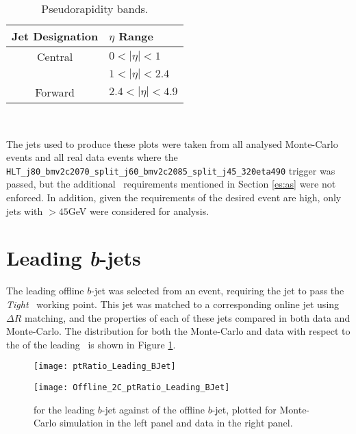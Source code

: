 	\begin{table}[h]
		\caption{Pseudorapidity bands.}
		\label{tab:etabands}
		\medskip
		\centering
		\begin{tabular}{cl}\toprule
			Jet Designation & $\eta$ Range \\\midrule
			Central & $0<|\eta|<1$ \\
			 & $1<|\eta|<2.4$  \\
			Forward & $2.4<|\eta|<4.9$ \\\bottomrule
		\end{tabular}\\[5pt]
	\end{table}

	The jets used to produce these plots were taken from all analysed Monte-Carlo events and all real data events where the \texttt{HLT\_j80\_bmv2c2070\_split\_\-j60\_bmv2c2085\_split\_j45\_320eta490} trigger was passed, but the additional \VBFHBB\, requirements mentioned in Section \ref{es:as} were not enforced. In addition, given the \pt requirements of the desired event are high, only jets with \pt$>45$GeV were considered for analysis.

\section{Leading \textit{b}-jets}
\label{OP:leadingb}

	The leading \pt offline $b$-jet was selected from an event, requiring the jet to pass the \textit{Tight} \btagging\ working point. This jet was matched to a corresponding online jet using $\Delta R$ matching, and the properties of each of these jets compared in both data and Monte-Carlo. The \dptpt distribution for both the Monte-Carlo and data with respect to the \pt of the leading \bjet\ is shown in Figure \ref{fig:O:leadingbpt}.

		\begin{figure}[h]
			\centering
			\begin{minipage}[h]{0.48\linewidth}
				\texttt{[image: ptRatio\_Leading\_BJet]}

			\end{minipage}
			\quad
			\begin{minipage}[h]{0.48\linewidth}
				\texttt{[image: Offline\_2C\_ptRatio\_Leading\_BJet]}
			\end{minipage}
			\caption{\dptpt for the leading \pt $b$-jet against \pt of the offline $b$-jet, plotted for Monte-Carlo simulation in the left panel and data in the right panel.}
			\label{fig:O:leadingbpt}
		\end{figure}

